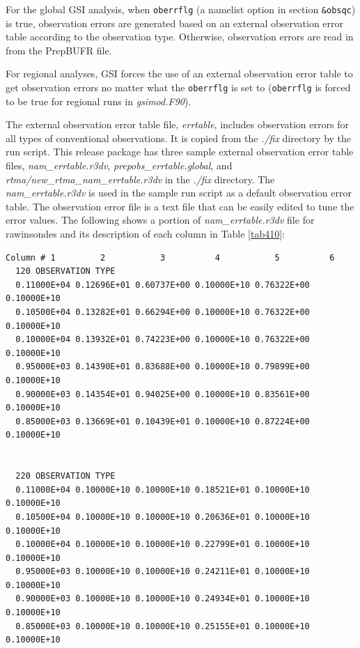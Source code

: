 For the global GSI analysis, when \verb|oberrflg| (a namelist option in section \verb|&obsqc|) is true, observation errors are generated based on an external observation error table according to the observation type. Otherwise, observation errors are read in from the PrepBUFR file.

For regional analyses, GSI forces the use of an external observation error table to get observation errors no matter what the \verb|oberrflg| is set to (\verb|oberrflg| is forced to be true for regional runs in \textit{gsimod.F90}).

The external observation error table file, \textit{errtable}, includes observation errors for all types of conventional observations. It is copied from the \textit{./fix} directory by the run script. This release package has three sample external observation error table files, \textit{nam\_errtable.r3dv}, \textit{prepobs\_errtable.global}, and \textit{rtma/new\_rtma\_nam\_errtable.r3dv} in the \textit{./fix} directory. The \textit{nam\_errtable.r3dv} is used in the sample run script as a default observation error table. The observation error file is a text file that can be easily edited to tune the error values. The following shows a portion of \textit{nam\_errtable.r3dv} file for rawinsondes and its description of each column in Table \ref{tab410}:

\begin{scriptsize}
\begin{verbatim}
Column # 1         2           3          4           5          6
  120 OBSERVATION TYPE
  0.11000E+04 0.12696E+01 0.60737E+00 0.10000E+10 0.76322E+00 0.10000E+10
  0.10500E+04 0.13282E+01 0.66294E+00 0.10000E+10 0.76322E+00 0.10000E+10
  0.10000E+04 0.13932E+01 0.74223E+00 0.10000E+10 0.76322E+00 0.10000E+10
  0.95000E+03 0.14390E+01 0.83688E+00 0.10000E+10 0.79899E+00 0.10000E+10
  0.90000E+03 0.14354E+01 0.94025E+00 0.10000E+10 0.83561E+00 0.10000E+10
  0.85000E+03 0.13669E+01 0.10439E+01 0.10000E+10 0.87224E+00 0.10000E+10


  220 OBSERVATION TYPE
  0.11000E+04 0.10000E+10 0.10000E+10 0.18521E+01 0.10000E+10 0.10000E+10
  0.10500E+04 0.10000E+10 0.10000E+10 0.20636E+01 0.10000E+10 0.10000E+10
  0.10000E+04 0.10000E+10 0.10000E+10 0.22799E+01 0.10000E+10 0.10000E+10
  0.95000E+03 0.10000E+10 0.10000E+10 0.24211E+01 0.10000E+10 0.10000E+10
  0.90000E+03 0.10000E+10 0.10000E+10 0.24934E+01 0.10000E+10 0.10000E+10
  0.85000E+03 0.10000E+10 0.10000E+10 0.25155E+01 0.10000E+10 0.10000E+10

\end{verbatim}
\end{scriptsize}

